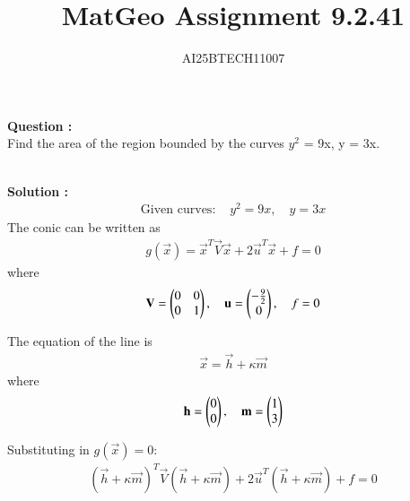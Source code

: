 \documentclass[journal]{IEEEtran}
\begin{document}

\vspace{3cm}

\title{MatGeo Assignment 9.2.41}
\author{AI25BTECH11007}
 \maketitle
{\let\newpage\relax\maketitle}

\renewcommand{\thefigure}{\theenumi}
\renewcommand{\thetable}{\theenumi}
\setlength{\intextsep}{10pt} %


\renewcommand{\thetable}{\theenumi}
\noindent
\textbf{Question :}\\
 Find the area of the region bounded by the curves $y^2$ = 9x, y = 3x.
 
\noindent\\
\textbf{Solution :}\\ 
\begin{align}
  \text{Given curves: } 
  & y^2 = 9x, \quad y = 3x
\end{align}
The conic can be written as
\begin{align}
g(\vec{x}) = \vec{x}^T\vec{V}\vec{x} + 2\vec{u}^T\vec{x} + f = 0
\end{align}
where
\begin{align}
\mathbf{V} = \begin{pmatrix}0 & 0 \\ 0 & 1\end{pmatrix}, \quad
\mathbf{u} = \begin{pmatrix}-\tfrac{9}{2} \\ 0\end{pmatrix}, \quad
f = 0
\end{align}

The equation of the line is
\begin{align}
\vec{x} = \vec{h} + \kappa \vec{m}
\end{align}
where
\begin{align}
\mathbf{h} = \begin{pmatrix}0 \\ 0\end{pmatrix}, \quad 
\mathbf{m} = \begin{pmatrix}1 \\ 3\end{pmatrix}
\end{align}

Substituting in $g(\vec{x}) = 0$:
\begin{align}
(\vec{h} + \kappa\vec{m})^T\vec{V}(\vec{h} + \kappa\vec{m})
+ 2\vec{u}^T(\vec{h} + \kappa\vec{m}) + f = 0
\end{align}
\end{document}
